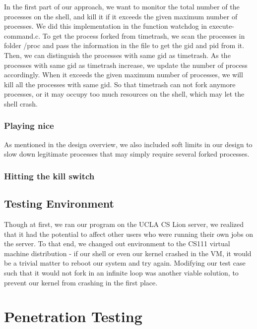 \documentclass{article}
\begin{document}
In the first part of our approach, we want to monitor the total number of the processes on the shell, and kill it if it exceeds the given maximum number of processes.
We did this implementation in the function watchdog in execute-command.c.  To get the process forked from timetrash, we scan the processes in folder /proc and pass the information in the file to get the gid and pid from it.  Then, we can distinguish the processes with same gid as timetrash.  As the processes with same gid as timetrash increase, we update the number of process accordingly.  When it exceeds the given maximum number of processes, we will kill all the processes with same gid.  So that timetrash can not fork anymore processes, or it may occupy too much resources on the shell, which may let the shell crash. \\

\subsubsection{Playing nice}
As mentioned in the design overview, we also included soft limits in our design
to slow down legitimate processes that may simply require several forked 
processes.

\subsubsection{Hitting the kill switch}

\subsection{Testing Environment}
Though at first, we ran our program on the UCLA CS Lion server, we realized
that it had the potential to affect other users who were running their own jobs
on the server. To that end, we changed out environment to the CS111 virtual 
machine distribution - if our shell or even our kernel crashed in the VM, it 
would be a trivial matter to reboot our system and try again. Modifying our 
test case such that it would not fork in an infinite loop was another viable
solution, to prevent our kernel from crashing in the first place. \\


\section{Penetration Testing}
\end{document}
